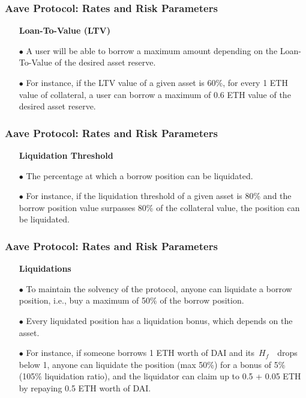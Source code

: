 \documentclass{beamer}
\begin{document}
\begin{frame}	
	\frametitle{Aave Protocol: Rates and Risk Parameters}
	\begin{itemize}
		\item[] \textbf{Loan-To-Value (LTV)}
		\linebreak
		\item[$\bullet$] A user will be able to borrow a maximum amount depending on the Loan-To-Value of the desired asset reserve. 
		\item[$\bullet$] For instance, if the LTV value of a given asset is  60\%, for every 1 ETH value of collateral, a user can borrow a maximum of 0.6 ETH value of the desired asset reserve.
	\end{itemize}
	
\end{frame}

\begin{frame}	
	\frametitle{Aave Protocol: Rates and Risk Parameters}
	\begin{itemize}
		\item[] \textbf{Liquidation Threshold}
		\linebreak
		\item[$\bullet$] The percentage at which a borrow position can be liquidated.
		\item[$\bullet$] For instance, if the liquidation threshold of a given asset is 80\% and the borrow position value surpasses 80\% of the collateral value, the position can be liquidated.
	\end{itemize}
	
\end{frame}


\begin{frame}	
	\frametitle{Aave Protocol: Rates and Risk Parameters}
	\begin{itemize}
		\item[] \textbf{Liquidations}
		\linebreak
		\item[$\bullet$] To maintain the solvency of the protocol, anyone can liquidate a borrow position, i.e., buy a maximum of 50\% of the borrow position.
		\item[$\bullet$] Every liquidated position has a liquidation bonus, which depends on the asset. 
		\item[$\bullet$] For instance, if someone borrows 1 ETH worth of DAI and its~$H_{f}$~\ drops below 1, anyone can liquidate the position (max 50\%) for a bonus of 5\% (105\% liquidation ratio), and the liquidator can claim up to 0.5 + 0.05 ETH by repaying 0.5 ETH worth of DAI.
	\end{itemize}
	
\end{frame}
\end{document}
